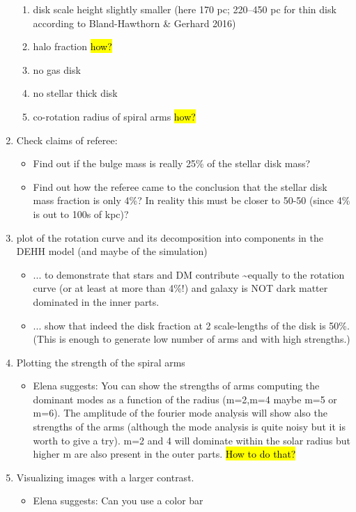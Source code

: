 \documentclass[10pt,a4paper]{article}
\begin{document}
\begin{enumerate}
\begin{enumerate}
\item disk scale height slightly smaller  (here 170 pc; 220–450 pc for thin disk according to Bland-Hawthorn \& Gerhard 2016)
\item halo fraction \hl{how?}
\item no gas disk
\item no stellar thick disk
\item co-rotation radius of spiral arms \hl{how?}
\end{enumerate}
\item Check claims of referee:
\begin{itemize}
\item Find out if the bulge mass is really 25\% of the stellar disk mass?
\item Find out how the referee came to the conclusion that the stellar disk mass fraction is only 4\%? In reality this must be closer to 50-50 (since 4\% is out to 100s of kpc)?
\end{itemize}
\item plot of the rotation curve and its decomposition into components in the DEHH model (and maybe of the simulation)
\begin{itemize}
\item ... to demonstrate that stars and DM contribute \textasciitilde equally to the rotation curve (or at least at more than 4\%!) and galaxy is NOT dark matter dominated in the inner parts. 
\item ... show that indeed the disk fraction at 2 scale-lengths of the disk is 50\%. (This is enough to generate low number of arms and with high strengths.)
\end{itemize}
\item Plotting the strength of the spiral arms
\begin{itemize}
\item Elena suggests: You can show the strengths of arms computing the dominant modes as a 
function of the radius (m=2,m=4 maybe m=5 or m=6). The amplitude of the 
fourier mode analysis will show also the strengths of the arms (although 
the mode analysis is quite noisy but it is worth to give a try). m=2 and 
4 will dominate within the solar radius but higher m are also present in 
the outer parts. \hl{How to do that?}
\end{itemize}
\item Visualizing images with a larger contrast. 
\begin{itemize} 
\item Elena suggests: Can you use a color bar 

\end{itemize}
\end{enumerate}
\end{document}
